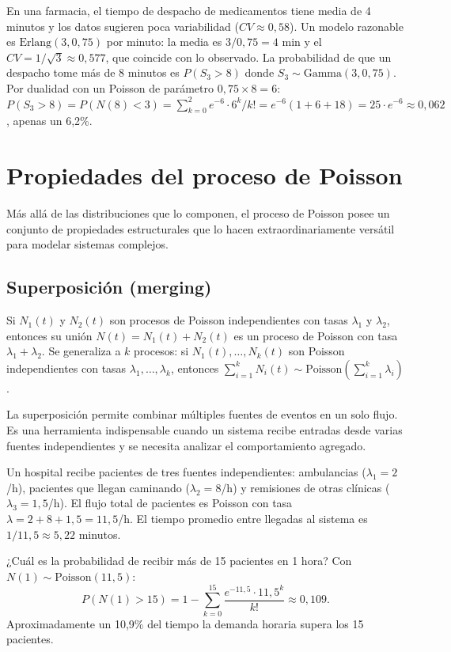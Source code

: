 \documentclass[11pt, letterpaper]{article}
\begin{document}
\begin{ejemplo}
En una farmacia, el tiempo de despacho de medicamentos tiene media de 4 minutos y los datos sugieren poca variabilidad ($CV \approx 0{,}58$). Un modelo razonable es $\text{Erlang}(3, 0{,}75)$ por minuto: la media es $3/0{,}75 = 4$ min y el $CV = 1/\sqrt{3} \approx 0{,}577$, que coincide con lo observado. La probabilidad de que un despacho tome más de 8 minutos es $P(S_3 > 8)$ donde $S_3 \sim \text{Gamma}(3, 0{,}75)$. Por dualidad con un Poisson de parámetro $0{,}75 \times 8 = 6$: $P(S_3 > 8) = P(N(8) < 3) = \sum_{k=0}^{2} e^{-6}\cdot 6^k/k! = e^{-6}(1 + 6 + 18) = 25 \cdot e^{-6} \approx 0{,}062$, apenas un 6{,}2\%.
\end{ejemplo}


\section{Propiedades del proceso de Poisson}

Más allá de las distribuciones que lo componen, el proceso de Poisson posee un conjunto de propiedades estructurales que lo hacen extraordinariamente versátil para modelar sistemas complejos.


\subsection{Superposición (merging)}

\begin{teorema}[Superposición]
Si $N_1(t)$ y $N_2(t)$ son procesos de Poisson independientes con tasas $\lambda_1$ y $\lambda_2$, entonces su unión $N(t) = N_1(t) + N_2(t)$ es un proceso de Poisson con tasa $\lambda_1 + \lambda_2$. Se generaliza a $k$ procesos: si $N_1(t), \ldots, N_k(t)$ son Poisson independientes con tasas $\lambda_1, \ldots, \lambda_k$, entonces $\sum_{i=1}^{k} N_i(t) \sim \text{Poisson}\!\left(\sum_{i=1}^{k} \lambda_i\right)$.
\end{teorema}

La superposición permite combinar múltiples fuentes de eventos en un solo flujo. Es una herramienta indispensable cuando un sistema recibe entradas desde varias fuentes independientes y se necesita analizar el comportamiento agregado.

\begin{ejemplo}
Un hospital recibe pacientes de tres fuentes independientes: ambulancias ($\lambda_1 = 2$/h), pacientes que llegan caminando ($\lambda_2 = 8$/h) y remisiones de otras clínicas ($\lambda_3 = 1{,}5$/h). El flujo total de pacientes es Poisson con tasa $\lambda = 2 + 8 + 1{,}5 = 11{,}5$/h. El tiempo promedio entre llegadas al sistema es $1/11{,}5 \approx 5{,}22$ minutos.

¿Cuál es la probabilidad de recibir más de 15 pacientes en 1 hora? Con $N(1) \sim \text{Poisson}(11{,}5)$:
\[
P(N(1) > 15) = 1 - \sum_{k=0}^{15} \frac{e^{-11{,}5}\cdot 11{,}5^k}{k!} \approx 0{,}109.
\]
Aproximadamente un 10{,}9\% del tiempo la demanda horaria supera los 15 pacientes.
\end{ejemplo}
\end{document}

